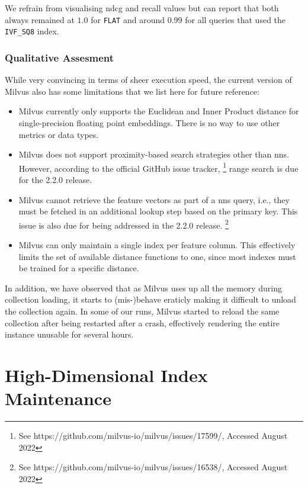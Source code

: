 We refrain from visualising \acrshort{ndcg} and recall values but can report that both always remained at $1.0$ for \texttt{FLAT} and around $0.99$ for all queries that used the \texttt{IVF\_SQ8} index.

\subsubsection{Qualitative Assesment}
While very convincing in terms of sheer execution speed, the current version of Milvus also has some limitations that we list here for future reference:

\begin{itemize}
    \item Milvus currently only supports the Euclidean and Inner Product distance for single-precision floating point embeddings. There is no way to use other metrics or data types.
    \item Milvus does not support proximity-based search strategies other than \acrshort{nns}. However, according to the official GitHub issue tracker, \footnote{See https://github.com/milvus-io/milvus/issues/17599/, Accessed August 2022} range search is due for the 2.2.0 release. 
    \item Milvus cannot retrieve the feature vectors as part of a \acrshort{nns} query, i.e., they must be fetched in an additional lookup step based on the primary key. This issue is also due for being addressed in the 2.2.0 release. \footnote{See https://github.com/milvus-io/milvus/issues/16538/, Accessed August 2022}
    \item Milvus can only maintain a single index per feature column. This effectively limits the set of available distance functions to one, since most indexes must be trained for a specific distance.
\end{itemize}

In addition, we have observed that as Milvus uses up all the memory during collection loading, it starts to (mis-)behave eraticly making it difficult to unload the collection again. In some of our runs, Milvus started to reload the same collection after being restarted after a crash, effectively rendering the entire instance unusable for several hours.

\section{High-Dimensional Index Maintenance}
\label{section:hd_index_maintenance_evaluation}

